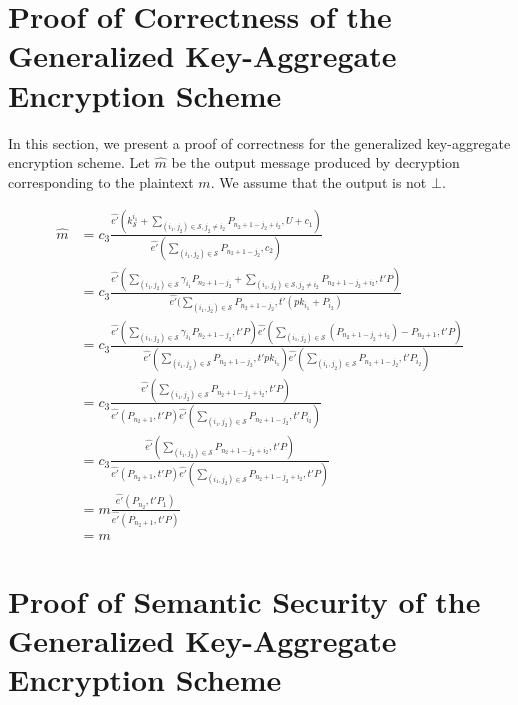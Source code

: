  

\section{Proof of Correctness of the Generalized Key-Aggregate Encryption Scheme}
\label{app_sec:correct_general}

In this section, we present a proof of correctness for the generalized key-aggregate encryption scheme. Let $\hat{m}$ be the output message produced by decryption corresponding to the plaintext $m$. We assume that the output is not $\bot$. 

\begin{scriptsize}
\begin{equation}
\begin{split}
 \hat{m} &= c_3\frac{\hat{e'}(k^{i_1}_{\mathcal{S}}+\sum_{(i_1,j_2)\in\mathcal{S},j_2\neq i_2}P_{n_2+1-j_2+i_2},U+c_1)}{\hat{e'}(\sum_{(i_1,j_2)\in\mathcal{S}}P_{n_2+1-j_2},c_2)}\\
  &= c_3\frac{\hat{e'}(\sum_{(i_1,j_2)\in \mathcal{S}}{\gamma_{i_1}}P_{n_2+1-j_2} + \sum_{(i_1,j_2)\in\mathcal{S},j_2\neq i_2}P_{n_2+1-j_2+i_2},t'P)}{\hat{e'}(\sum_{(i_1,j_2)\in\mathcal{S}}P_{n_2+1-j_2},t'(pk_{i_1}+P_{i_2})}\\
  &= c_3\frac{\hat{e'}(\sum_{(i_1,j_2)\in \mathcal{S}}{\gamma_{i_1}}P_{n_2+1-j_2},t'P)\hat{e'}(\sum_{(i_1,j_2)\in\mathcal{S}}(P_{n_2+1-j_2+i_2})-P_{n_2+1},t'P)}{\hat{e'}(\sum_{(i_1,j_2)\in\mathcal{S}}P_{n_2+1-j_2},t'pk_{i_1})\hat{e'}(\sum_{(i_1,j_2)\in\mathcal{S}}P_{n_2+1-j_2},t'P_{i_2})}\\
  &= c_3\frac{\hat{e'}(\sum_{(i_1,j_2)\in\mathcal{S}}P_{n_2+1-j_2+i_2},t'P)}{\hat{e'}(P_{n_2+1},t'P)\hat{e'}(\sum_{(i_1,j_2)\in\mathcal{S}}P_{n_2+1-j_2},t'P_{i_2})}\\
  &= c_3\frac{\hat{e'}(\sum_{(i_1,j_2)\in\mathcal{S}}P_{n_2+1-j_2+i_2},t'P)}{\hat{e'}(P_{n_2+1},t'P)\hat{e'}(\sum_{(i_1,j_2)\in\mathcal{S}}P_{n_2+1-j_2+i_2},t'P)}\\
  &= m\frac{\hat{e'}(P_{n_2},t'P_1)}{\hat{e'}(P_{n_2+1},t'P)}\\
  &= m
\end{split}  
\end{equation}
\end{scriptsize}


\section{Proof of Semantic Security of the Generalized Key-Aggregate Encryption Scheme}
\label{app_sec:proof_general}

